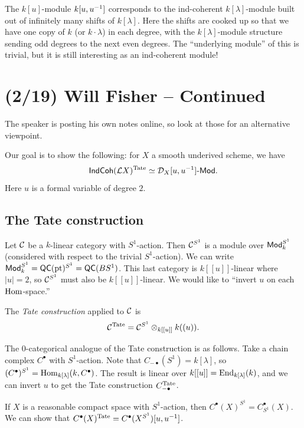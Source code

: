\documentclass{article}
\begin{document}
\begin{ex}
  The $k[u]$-module $k[u, u^{-1}]$ corresponds to the ind-coherent $k[\lambda]$-module built out of infinitely many shifts of $k[\lambda]$.
  Here the shifts are cooked up so that we have one copy of $k$ (or $k \cdot \lambda$) in each degree, with the $k[\lambda]$-module structure sending odd degrees to the next even degrees.
  The ``underlying module'' of this is trivial, but it is still interesting as an ind-coherent module!
\end{ex}

\section{(2/19) Will Fisher -- Continued}

The speaker is posting his own notes online, so look at those for an alternative viewpoint.

Our goal is to show the following: for $X$ a smooth underived scheme, we have
\[
  \mathsf{IndCoh}(\mathcal{L} X)^{\mathrm{Tate}} \simeq \mathcal{D}_X[u, u^{-1}]\text{-}\mathsf{Mod}.
\]
Here $u$ is a formal variable of degree $2$.

\subsection{The Tate construction}

Let $\mathcal{C}$ be a $k$-linear category with $S^1$-action.
Then $\mathcal{C}^{S^1}$ is a module over $\mathsf{Mod}_k^{S^1}$ (considered with respect to the trivial $S^1$-action).
We can write $\mathsf{Mod}_k^{S^1} = \mathsf{QC}(\operatorname{pt})^{S^1} = \mathsf{QC}(BS^1)$.
This last category is $k[[u]]$-linear where $|u| = 2$, so $\mathcal{C}^{S^1}$ must also be $k[[u]]$-linear.
We would like to ``invert $u$ on each $\operatorname{Hom}$-space.''

\begin{dfn}
  The \emph{Tate construction} applied to $\mathcal{C}$ is
  \[
    \mathcal{C}^{\mathrm{Tate}} = \mathcal{C}^{S^1} \otimes_{k[[u]]} k((u)).
  \]
\end{dfn}

\begin{rmk}
  The $0$-categorical analogue of the Tate construction is as follows.
  Take a chain complex $C^\bullet$ with $S^1$-action.
  Note that $C_{-\bullet}(S^1) = k[\lambda]$, so $(C^\bullet)^{S^1} = \operatorname{Hom}_{k[\lambda]}(k, C^\bullet)$.
  The result is linear over $k[[u]] = \operatorname{End}_{k[\lambda]}(k)$, and we can invert $u$ to get the Tate construction $C_{-\bullet}^{\mathrm{Tate}}$.

  If $X$ is a reasonable compact space with $S^1$-action, then $C^\bullet(X)^{S^1} = C^\bullet_{S^1}(X)$.
  We can show that $C^\bullet(X)^{\mathrm{Tate}} = C^\bullet(X^{S^1})[u, u^{-1}]$.
\end{rmk}
\end{document}
